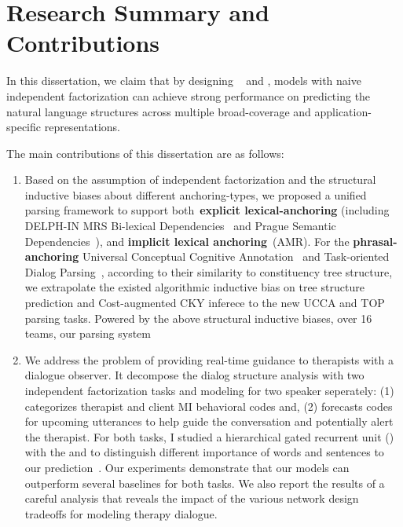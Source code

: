 \section[Research Summary and Contributions]{Research Summary and Contributions}
\label{sec:conclustions:claims}

In this dissertation, we claim that by designing ~ and ,
models with naive independent factorization can achieve strong
performance on predicting the natural language structures across
multiple broad-coverage and application-specific representations.

The main contributions of this dissertation are as follows:

\begin{enumerate}
\item Based on the assumption of independent factorization and the
  structural inductive biases about different anchoring-types, we
  proposed a unified parsing framework to support
  both~\textbf{explicit lexical-anchoring} (including DELPH-IN MRS
  Bi-lexical Dependencies~\citep[DM,][]{ivanova2012did} and Prague
  Semantic
  Dependencies~\citep[PSD,][]{hajic2012announcing,miyao2014house}),
  and \textbf{implicit lexical anchoring}~(AMR). For the
  \textbf{phrasal-anchoring} Universal Conceptual Cognitive
  Annotation~\citep[UCCA,][]{abend2013universal} and Task-oriented
  Dialog Parsing~\citep[TOP,][]{gupta-etal-2018-semantic-parsing},
  according to their similarity to constituency tree structure, we
  extrapolate the existed algorithmic inductive bias on tree structure
  prediction and Cost-augmented CKY inferece to the new UCCA and TOP
  parsing tasks. Powered by the above structural inductive biases,
  over 16 teams, our parsing system~\citep{cao2019amazon} 

\item We address the problem of providing real-time guidance to
  therapists with a dialogue observer. It decompose the dialog
  structure analysis with two independent factorization tasks and
  modeling for two speaker seperately: (1) categorizes therapist and
  client MI behavioral codes and, (2) forecasts codes for upcoming
  utterances to help guide the conversation and potentially alert the
  therapist. For both tasks, I studied a hierarchical gated recurrent
  unit (\HGRU) with the  and
   to distinguish different importance of
  words and sentences to our
  prediction~\citep{jie2019psycdialacl}. Our experiments demonstrate
  that our models can outperform several baselines for both tasks.  We
  also report the results of a careful analysis that reveals the
  impact of the various network design tradeoffs for modeling therapy
  dialogue.


\end{enumerate}
